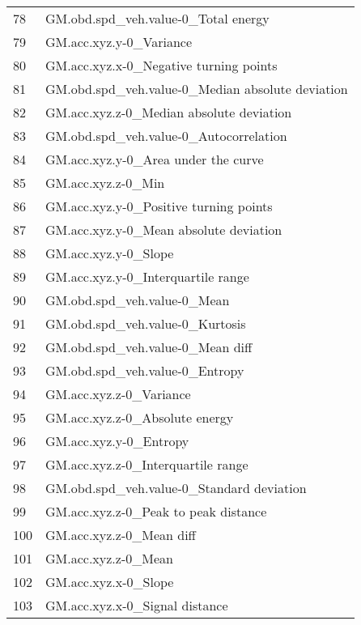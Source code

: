 \begin{tabular}{ll}
78  &               GM.obd.spd\_veh.value-0\_Total energy \\
79  &                           GM.acc.xyz.y-0\_Variance \\
80  &            GM.acc.xyz.x-0\_Negative turning points \\
81  &  GM.obd.spd\_veh.value-0\_Median absolute deviation \\
82  &          GM.acc.xyz.z-0\_Median absolute deviation \\
83  &            GM.obd.spd\_veh.value-0\_Autocorrelation \\
84  &               GM.acc.xyz.y-0\_Area under the curve \\
85  &                                GM.acc.xyz.z-0\_Min \\
86  &            GM.acc.xyz.y-0\_Positive turning points \\
87  &            GM.acc.xyz.y-0\_Mean absolute deviation \\
88  &                              GM.acc.xyz.y-0\_Slope \\
89  &                GM.acc.xyz.y-0\_Interquartile range \\
90  &                       GM.obd.spd\_veh.value-0\_Mean \\
91  &                   GM.obd.spd\_veh.value-0\_Kurtosis \\
92  &                  GM.obd.spd\_veh.value-0\_Mean diff \\
93  &                    GM.obd.spd\_veh.value-0\_Entropy \\
94  &                           GM.acc.xyz.z-0\_Variance \\
95  &                    GM.acc.xyz.z-0\_Absolute energy \\
96  &                            GM.acc.xyz.y-0\_Entropy \\
97  &                GM.acc.xyz.z-0\_Interquartile range \\
98  &         GM.obd.spd\_veh.value-0\_Standard deviation \\
99  &              GM.acc.xyz.z-0\_Peak to peak distance \\
100 &                          GM.acc.xyz.z-0\_Mean diff \\
101 &                               GM.acc.xyz.z-0\_Mean \\
102 &                              GM.acc.xyz.x-0\_Slope \\
103 &                    GM.acc.xyz.x-0\_Signal distance \\

\end{tabular}
